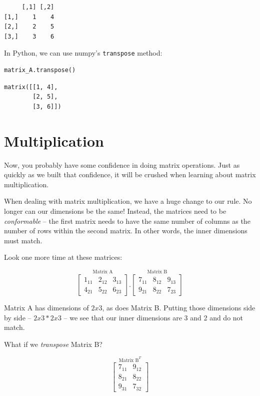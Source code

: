 \documentclass[
  letterpaper,
]{krantz}
\begin{document}
\begin{verbatim}
     [,1] [,2]
[1,]    1    4
[2,]    2    5
[3,]    3    6
\end{verbatim}

In Python, we can use numpy's \texttt{transpose} method:

\begin{verbatim}
matrix_A.transpose()
\end{verbatim}

\begin{verbatim}
matrix([[1, 4],
        [2, 5],
        [3, 6]])
\end{verbatim}

\section{Multiplication}\label{multiplication}

Now, you probably have some confidence in doing matrix operations. Just
as quickly as we built that confidence, it will be crushed when learning
about matrix multiplication.

When dealing with matrix multiplication, we have a huge change to our
rule. No longer can our dimensions be the same! Instead, the matrices
need to be \emph{conformable} -- the first matrix needs to have the same
number of columns as the number of rows within the second matrix. In
other words, the inner dimensions must match.

Look one more time at these matrices:

\[
\stackrel{\mbox{Matrix A}}{
\begin{bmatrix}
1_{11} & 2_{12} & 3_{13}\\
4_{21} & 5_{22} & 6_{23}
\end{bmatrix}
}
.
\stackrel{\mbox{Matrix B}}{
\begin{bmatrix}
7_{11} & 8_{12} & 9_{13}\\
9_{21} & 8_{22} & 7_{23}
\end{bmatrix} 
}
\]

Matrix A has dimensions of \(2x3\), as does Matrix B. Putting those
dimensions side by side -- \(2x3 * 2x3\) -- we see that our inner
dimensions are 3 and 2 and do not match.

What if we \emph{transpose} Matrix B?

\[
\stackrel{\mbox{Matrix B}^T}{
\begin{bmatrix}
7_{11} & 9_{12} \\ 
8_{21}& 8_{22}\\
9_{31} & 7_{32}
\end{bmatrix} 
}
\]
\end{document}
